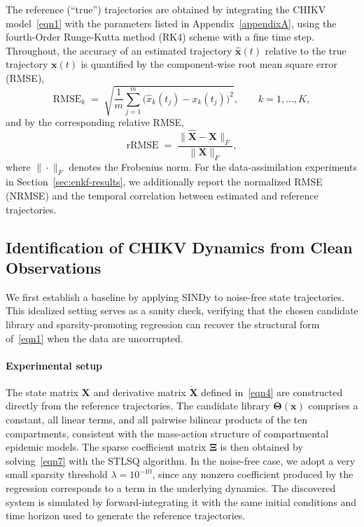 \documentclass[9pt]{article}
\newcommand\bfX{\mathbf{X}}
\newcommand\bfx{\mathbf{x}}
\numberwithin{equation}{section}
\begin{document}
The reference (``true'') trajectories are obtained by integrating the CHIKV model~\eqref{eqn1} with the parameters listed in Appendix~\ref{appendixA}, using the fourth-Order Runge-Kutta method (RK4) scheme with a fine time step. Throughout, the accuracy of an estimated trajectory $\widehat{\bfx}(t)$ relative to the true trajectory $\bfx(t)$ is quantified by the component-wise root mean square error (RMSE),
\begin{equation}\label{eqn:rmse_def}
    \mathrm{RMSE}_k \;=\; \sqrt{\frac{1}{m}\sum_{j=1}^{m}\bigl(\widehat{x}_k(t_j)-x_k(t_j)\bigr)^2},\qquad k=1,\ldots,K,
\end{equation}
and by the corresponding relative RMSE,
\begin{equation}\label{eqn:rrmse_def}
    \mathrm{rRMSE} \;=\; \frac{\|\widehat{\bfX}-\bfX\|_F}{\|\bfX\|_F},
\end{equation}
where $\|\cdot\|_F$ denotes the Frobenius norm. For the data-assimilation experiments in Section~\ref{sec:enkf-results}, we additionally report the normalized RMSE (NRMSE) and the temporal correlation between estimated and reference trajectories.
\subsection{Identification of CHIKV Dynamics from Clean Observations}\label{sec:sindy-clean}
We first establish a baseline by applying SINDy to noise-free state trajectories. This idealized setting serves as a sanity check, verifying that the chosen candidate library and sparsity-promoting regression can recover the structural form of~\eqref{eqn1} when the data are uncorrupted.
 
\paragraph{Experimental setup}\label{sec:sindy-clean-setup}
The state matrix $\bfX$ and derivative matrix $\dot{\bfX}$ defined in~\eqref{eqn4} are constructed directly from the reference trajectories. The candidate library $\boldsymbol{\Theta}(\bfx)$ comprises a constant, all linear terms, and all pairwise bilinear products of the ten compartments, consistent with the mass-action structure of compartmental epidemic models. The sparse coefficient matrix $\boldsymbol{\Xi}$ is then obtained by solving~\eqref{eqn7} with the STLSQ algorithm. In the noise-free case, we adopt a very small sparsity threshold $\lambda = 10^{-10}$, since any nonzero coefficient produced by the regression corresponds to a term in the underlying dynamics. The discovered system is simulated by forward-integrating it with the same initial conditions and time horizon used to generate the reference trajectories.
 
\end{document}
